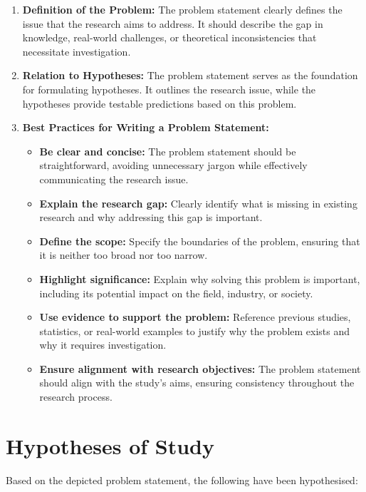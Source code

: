 \begin{enumerate}
    \item \textbf{Definition of the Problem:} The problem statement clearly defines the issue that the research aims to address. It should describe the gap in knowledge, real-world challenges, or theoretical inconsistencies that necessitate investigation.

    \item \textbf{Relation to Hypotheses:} The problem statement serves as the foundation for formulating hypotheses. It outlines the research issue, while the hypotheses provide testable predictions based on this problem.

    \item \textbf{Best Practices for Writing a Problem Statement:}
    \begin{itemize}
        \item \textbf{Be clear and concise:} The problem statement should be straightforward, avoiding unnecessary jargon while effectively communicating the research issue.
        \item \textbf{Explain the research gap:} Clearly identify what is missing in existing research and why addressing this gap is important.
        \item \textbf{Define the scope:} Specify the boundaries of the problem, ensuring that it is neither too broad nor too narrow.
        \item \textbf{Highlight significance:} Explain why solving this problem is important, including its potential impact on the field, industry, or society.
        \item \textbf{Use evidence to support the problem:} Reference previous studies, statistics, or real-world examples to justify why the problem exists and why it requires investigation.
        \item \textbf{Ensure alignment with research objectives:} The problem statement should align with the study’s aims, ensuring consistency throughout the research process.
    \end{itemize}
\end{enumerate}


\section{Hypotheses of Study}
Based on the depicted problem statement, the following have been hypothesised:

